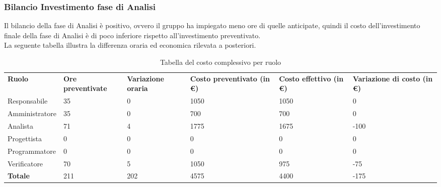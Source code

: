 \subsubsection{Bilancio Investimento fase di Analisi}
Il bilancio della fase di Analisi è positivo, ovvero il gruppo ha impiegato meno ore di quelle anticipate, quindi il costo dell'investimento finale della fase di Analisi è di poco inferiore rispetto all'investimento preventivato.\\
La seguente tabella illustra la differenza oraria ed economica rilevata a posteriori.
{
\renewcommand{\arraystretch}{2}
\begin{longtable}[h]{ C{2.5cm} C{2cm} C{1.8cm} C{2.2cm} C{1.5cm} C{2.3cm}}
\caption{Tabella del costo complessivo per ruolo}\\
\rowcolor{\primaryColor}

\textcolor{\secondaryColor}{\textbf{Ruolo}} & 
\textcolor{\secondaryColor}{\textbf{Ore preventivate}} & 
\textcolor{\secondaryColor}{\textbf{Variazione oraria}} & 
\textcolor{\secondaryColor}{\textbf{Costo preventivato (in \euro{})}} & 
\textcolor{\secondaryColor}{\textbf{Costo effettivo (in \euro{})}} & 
\textcolor{\secondaryColor}{\textbf{Variazione di costo (in \euro{})}}\\	
	
Responsabile    &  35 & 0 & 1050 & 1050 &  0 \\
Amministratore  &  35 & 0 & 700 & 700 & 0 \\
Analista        & 71 & 4 & 1775 & 1675 & -100 \\
Progettista     &   0 &   0 &    0 &  0 & 0 \\
Programmatore   &   0 &   0 &    0 &  0 & 0 \\
Verificatore    &  70 &  5 & 1050 & 975 & -75 \\
\textbf{Totale} & 211 & 202 & 4575 & 4400 & -175 \\	

\end{longtable}
}

